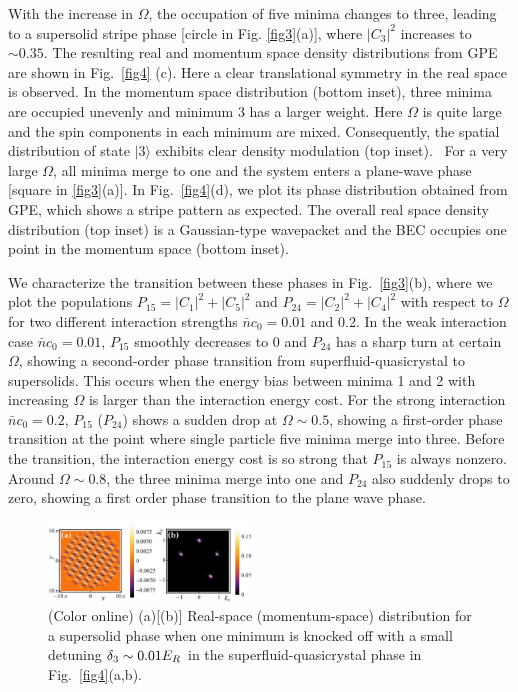 \documentclass[twocolumn,prl,floatfix,citeautoscript,nofootinbib]{revtex4}
\begin{document}
With the increase in $\Omega $, the occupation of five minima changes to
three, leading to a supersolid stripe phase [circle in Fig. \ref{fig3}(a)],
where $|C_{3}|^{2}$ increases to $\sim 0.35$. The resulting real and
momentum space density distributions from GPE are shown in Fig.~\ref{fig4}%
(c). Here a clear translational symmetry in the real space is observed. In
the momentum space distribution (bottom inset), three minima are occupied
unevenly and minimum 3 has a larger weight. Here $\Omega $ is quite large
and the spin components in each minimum are mixed. Consequently, the spatial
distribution of state $|3\rangle $ exhibits clear density modulation (top
inset). \ For a very large $\Omega $, all minima merge to one and the system
enters a plane-wave phase [square in \ref{fig3}(a)]. In Fig.~\ref{fig4}(d),
we plot its phase distribution obtained from GPE, which shows a stripe
pattern as expected. The overall real space density distribution (top inset)
is a Gaussian-type wavepacket and the BEC occupies one point in the momentum
space (bottom inset).

We characterize the transition between these phases in Fig.~\ref{fig3}(b),
where we plot the populations $P_{15}=|C_{1}|^{2}+|C_{5}|^{2}$ and $%
P_{24}=|C_{2}|^{2}+|C_{4}|^{2}$ with respect to $\Omega $ for two different
interaction strengths $\bar{n}c_{0}=0.01$ and 0.2. In the weak interaction
case $\bar{n}c_{0}=0.01$, $P_{15}$ smoothly decreases to $0$ and $P_{24}$
has a sharp turn at certain $\Omega $, showing a second-order phase
transition from superfluid-quasicrystal to supersolids. This occurs when the
energy bias between minima 1 and 2 with increasing $\Omega $ is larger than
the interaction energy cost. For the strong interaction $\bar{n}c_{0}=0.2$, $%
P_{15}$ ($P_{24}$) shows a sudden drop at $\Omega \sim 0.5$, showing a
first-order phase transition at the point where single particle five minima
merge into three. Before the transition, the interaction energy cost is so
strong that $P_{15}$ is always nonzero. Around $\Omega \sim 0.8$, the three
minima merge into one and $P_{24}$ also suddenly drops to zero, showing a
first order phase transition to the plane wave phase.

\begin{figure}[t]
\centering
\includegraphics[width=0.48\textwidth]{Fig5.pdf}
\caption{(Color online) (a)[(b)] Real-space (momentum-space) distribution
for a supersolid phase when one minimum is knocked off with a small detuning
$\protect\delta _{3}\sim 0.01E_{R}$ in the superfluid-quasicrystal phase in
Fig.~\protect\ref{fig4}(a,b).}
\label{fig5}
\end{figure}
\end{document}
